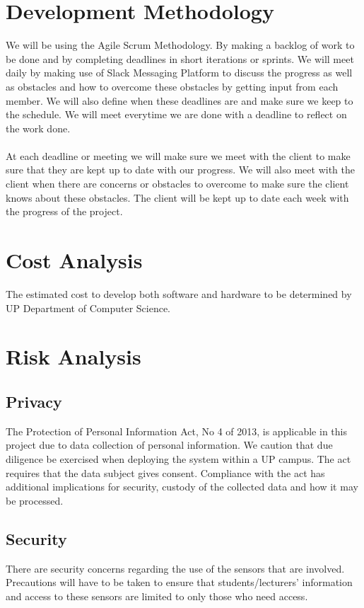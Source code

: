 \documentclass{article}
\begin{document}
\section{Development Methodology}
We will be using the Agile Scrum Methodology. By making a backlog of work to be done and by completing deadlines in short iterations or sprints. We will meet daily by making use of  Slack Messaging Platform to discuss the progress as well as obstacles and how to overcome these obstacles by getting input from each member. We will also define when these deadlines are and make sure we keep to the schedule. We will meet everytime we are done with a deadline to reflect on the work done. \\ \\
At each deadline or meeting we will make sure we meet with the client to make sure that they are kept up to date with our progress. We will also meet with the client when there are concerns or obstacles to overcome to make sure the client knows  about these obstacles. The client will be kept up to date each week with the progress of the project.
\section{Cost Analysis}
The estimated cost to develop both software and hardware to be determined by UP Department
of Computer Science.

\section{Risk Analysis}
\subsection{Privacy}
The Protection of Personal Information Act, No 4 of 2013, is applicable in this project due to data collection of personal information. We caution that due diligence be exercised when deploying the system within a UP campus. The act requires that the data subject gives consent. Compliance with the act has additional implications for security, custody of the collected data and how it may be processed.

\subsection{Security}
There are security concerns regarding the use of  the sensors that are involved. Precautions will have to be taken to ensure that students/lecturers' information and access to these sensors are limited to only those who need access.
\end{document}

